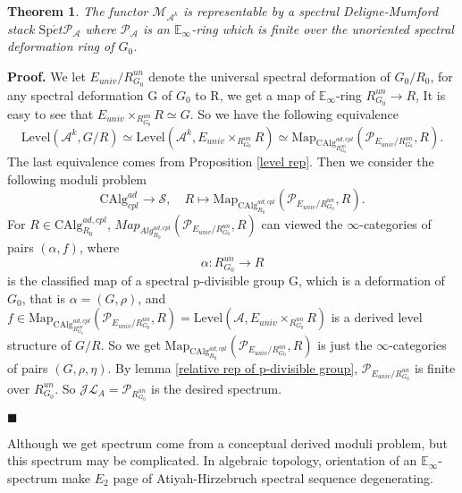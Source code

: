 \documentclass[12pt]{article}
\newtheorem{theorem}{Theorem}[section] %
\theoremstyle{thry}
\renewenvironment{proof}
{\par \noindent \textbf{Proof.}}
{ \par \hfill $\blacksquare$ \quad \par }
\def  \CAlg     {\mathrm{CAlg}}
\def  \Level    {\mathrm{Level}}
\def  \Map      {\mathrm{Map}}
\def  \Spet     {\mathrm{Sp}\acute{e}t}
\def  \ca       {\mathcal{A}}
\def  \cj       {\mathcal{J}}
\def  \cl       {\mathcal{L}}
\def  \cm       {\mathcal{M}}
\def  \cp       {\mathcal{P}}
\def  \cs       {\mathcal{S}}
\def  \be       {\mathbb{E}}
\begin{document}
\begin{theorem}
	The functor $\cm_{\ca^k}$ is representable by a  spectral Deligne-Mumford stack $\Spet \cp_{\ca}$ where $\cp_{\ca}$ is an $\be_{\infty}$-ring which is finite  over the unoriented spectral deformation ring of $G_0$.
\end{theorem}

\begin{proof}
	We let $E_{univ}/R^{un}_{G_0}$ denote the universal spectral deformation of $G_0/R_0$, for any  spectral deformation G of $G_0$ to R, we get a map of $\be_{\infty}$-ring $ R^{un}_{G_0} \to R $, 
   It is easy to see that $E_{univ}  \times_{R^{un}_{G_0}} R \simeq G$. So we have the following equivalence
   $$
   \Level(\ca^k, G/R) \simeq \Level(\ca^k, E_{univ}  \times_{R^{un}_{G_0}} R ) \simeq \Map_{\CAlg^{ad,cpl}_{R^{un}_{G_0}}}(\cp_{E_{univ}/R^{un}_{G_0}}, R ).
   $$
   The last equivalence comes from Proposition \ref{level rep}. Then we consider the following moduli problem
   $$
   \CAlg^{ad}_{cpl} \to \cs,  \quad  R \mapsto  \Map_{\CAlg_{R_0}^{ad,cpl}}(\cp_{E_{univ}/R^{un}_{G_0}}, R ).
   $$
   For  $R \in  \CAlg_{R_0}^{ad,cpl}$, $Map_{Alg_{R_0}^{ad,cpl}}(\cp_{E_{univ}/R^{un}_{G_0}}, R )$ can  viewed the $\infty$-categories of pairs $(\alpha, f)$, where 
    $$
    \alpha:R^{un}_{G_0}\to R
    $$ 
    is the  classified map of a spectral p-divisible group G,  which is a  deformation  of $G_0$, that is $\alpha=(G, \rho)$, and $f \in \Map_{\CAlg^{ad,cpl}_{R^{un}_{G_0}}}(\cp_{E_{univ}/R^{un}_{G_0}}, R )= \Level(\ca, E_{univ}  \times_{R^{un}_{G_0}} R ) $ is a derived level structure of $G/R$.  So we get $\Map_{\CAlg_{R_0}^{ad,cpl}}(\cp_{E_{univ}/R^{un}_{G_0}}, R )$ is just the $\infty$-categories of pairs $(G, \rho,\eta)$.  By lemma \ref{relative rep of p-divisible group}, $\cp_{E_{univ}/R^{un}_{G_0}}$ is finite over $R^{un}_{G_0}$. So $\cj \cl_{A} = \cp_{R^{un}_{G_0}}$ is the desired spectrum. 
   
   
\end{proof}



Although we get spectrum come from a conceptual derived moduli problem, but this spectrum may be complicated. In algebraic topology,  orientation of an $\be_{\infty}$-spectrum make $E_{2}$ page of Atiyah-Hirzebruch  spectral sequence degenerating.
\end{document}
